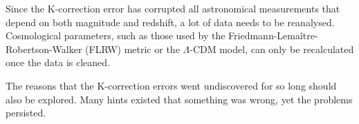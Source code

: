 \documentclass[aps,prl,reprint,amsmath]{revtex4-2}
\begin{document}
Since the K-correction error has corrupted all astronomical measurements that
depend on both magnitude and redshift, a lot of data needs to be reanalysed.
Cosmological parameters, such as those used by the
Friedmann-Lema\^{i}tre-Robertson-Walker (FLRW) metric or the $\Lambda$-CDM
model, can only be recalculated once the data is cleaned.

The reasons that the K-correction errors went undiscovered for so long should
also be explored. Many hints existed that something was wrong, yet the
problems persisted.

{}

\end{document}
